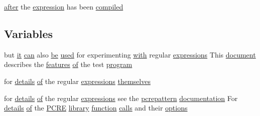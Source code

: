 \begin{DoxyCompactItemize}
\hyperlink{group__MOD__PROXY_gabe5742ecd24263fc01da937ad820d3fa}{after} the \hyperlink{pcregrep_8txt_a05ebca6485a470f925576189fae31ebf}{expression} has been \hyperlink{pcre_8txt_acf222623ce317d6483b477005378ffb0}{compiled}
\end{DoxyCompactItemize}
\subsection*{Variables}
\begin{DoxyCompactItemize}
\item 
but \hyperlink{pcretest_8txt_ab977b64dbdb969ce031dc4281a792b3c}{it} \hyperlink{pcre_8txt_a2a892895a50bc58f3679c7acb58190e6}{can} also \hyperlink{NON-AUTOTOOLS-BUILD_8txt_ac08ce70cbd4f453457597ad15ecbebdd}{be} \hyperlink{pcregrep_8txt_ac199431a7baad211fadcdb6c45bfe7c0}{used} for experimenting \hyperlink{group__apr__atomic_ga62bdcea60b77e638d3d88947a34aff05}{with} regular \hyperlink{perltest_8txt_a7df68229a6e0e55982138713459bcfb2}{expressions} This \hyperlink{pcregrep_8txt_abe5611420b9e5cd83a01bb86ff335529}{document} describes the \hyperlink{structfeatures}{features} \hyperlink{pcre_8txt_a9d5b55a535a7d176d14b62d664b47b4d}{of} the test \hyperlink{pcretest_8txt_a48917cf15a1089461e55bc56de9a58c3}{program}
\item 
for \hyperlink{pcretest_8txt_a6e95cd1d755c3f872f44f3e0dad7dabe}{details} \hyperlink{pcre_8txt_a9d5b55a535a7d176d14b62d664b47b4d}{of} the regular \hyperlink{perltest_8txt_a7df68229a6e0e55982138713459bcfb2}{expressions} \hyperlink{pcretest_8txt_a52bf23c086c7421dd94ad21c89ac2e65}{themselves}
\item 
for \hyperlink{pcretest_8txt_a6e95cd1d755c3f872f44f3e0dad7dabe}{details} \hyperlink{pcre_8txt_a9d5b55a535a7d176d14b62d664b47b4d}{of} the regular \hyperlink{perltest_8txt_a7df68229a6e0e55982138713459bcfb2}{expressions} see the \hyperlink{pcregrep_8txt_aff534a6bffe6bbe4e7d3d32437e87474}{pcrepattern} \hyperlink{pcre_8txt_a5c227f81d9a06a8bc0cfd7b51643c528}{documentation} For \hyperlink{pcretest_8txt_a6e95cd1d755c3f872f44f3e0dad7dabe}{details} \hyperlink{pcre_8txt_a9d5b55a535a7d176d14b62d664b47b4d}{of} the \hyperlink{pcre_8txt_a970782a5ef22596881e664deb789f171}{P\+C\+RE} \hyperlink{pcretest_8txt_a7d2e848fb4392b4e74cbf478dbdc6ad1}{library} \hyperlink{pcretest_8txt_abd306f12a46ac3f6be69579bceb817d0}{function} \hyperlink{pcregrep_8txt_afff19abbc607370968064c65893eb4d2}{calls} and their \hyperlink{pcretest_8txt_aa6c9d809037676d22aceaf5517a33faf}{options}
\item 

\end{DoxyCompactItemize}
